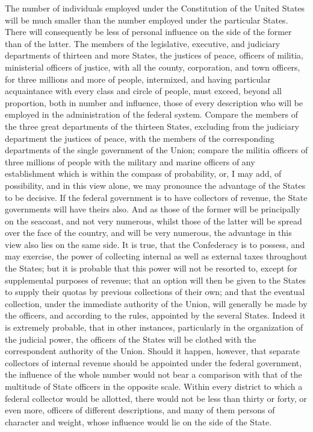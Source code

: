 The number of individuals employed under the Constitution of the United States will be much smaller than the number employed under the particular States. There will consequently be less of personal influence on the side of the former than of the latter. The members of the legislative, executive, and judiciary departments of thirteen and more States, the justices of peace, officers of militia, ministerial officers of justice, with all the county, corporation, and town officers, for three millions and more of people, intermixed, and having particular acquaintance with every class and circle of people, must exceed, beyond all proportion, both in number and influence, those of every description who will be employed in the administration of the federal system. Compare the members of the three great departments of the thirteen States, excluding from the judiciary department the justices of peace, with the members of the corresponding departments of the single government of the Union; compare the militia officers of three millions of people with the military and marine officers of any establishment which is within the compass of probability, or, I may add, of possibility, and in this view alone, we may pronounce the advantage of the States to be decisive. If the federal government is to have collectors of revenue, the State governments will have theirs also. And as those of the former will be principally on the seacoast, and not very numerous, whilst those of the latter will be spread over the face of the country, and will be very numerous, the advantage in this view also lies on the same side. It is true, that the Confederacy is to possess, and may exercise, the power of collecting internal as well as external taxes throughout the States; but it is probable that this power will not be resorted to, except for supplemental purposes of revenue; that an option will then be given to the States to supply their quotas by previous collections of their own; and that the eventual collection, under the immediate authority of the Union, will generally be made by the officers, and according to the rules, appointed by the several States. Indeed it is extremely probable, that in other instances, particularly in the organization of the judicial power, the officers of the States will be clothed with the correspondent authority of the Union. Should it happen, however, that separate collectors of internal revenue should be appointed under the federal government, the influence of the whole number would not bear a comparison with that of the multitude of State officers in the opposite scale. Within every district to which a federal collector would be allotted, there would not be less than thirty or forty, or even more, officers of different descriptions, and many of them persons of character and weight, whose influence would lie on the side of the State.

